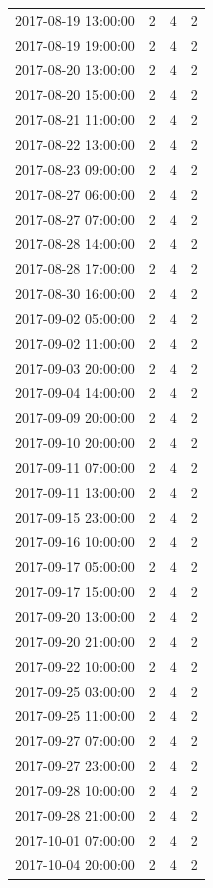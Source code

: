 \begin{tabular}{lrrr}
2017-08-19 13:00:00 & 2 & 4 & 2 \\
2017-08-19 19:00:00 & 2 & 4 & 2 \\
2017-08-20 13:00:00 & 2 & 4 & 2 \\
2017-08-20 15:00:00 & 2 & 4 & 2 \\
2017-08-21 11:00:00 & 2 & 4 & 2 \\
2017-08-22 13:00:00 & 2 & 4 & 2 \\
2017-08-23 09:00:00 & 2 & 4 & 2 \\
2017-08-27 06:00:00 & 2 & 4 & 2 \\
2017-08-27 07:00:00 & 2 & 4 & 2 \\
2017-08-28 14:00:00 & 2 & 4 & 2 \\
2017-08-28 17:00:00 & 2 & 4 & 2 \\
2017-08-30 16:00:00 & 2 & 4 & 2 \\
2017-09-02 05:00:00 & 2 & 4 & 2 \\
2017-09-02 11:00:00 & 2 & 4 & 2 \\
2017-09-03 20:00:00 & 2 & 4 & 2 \\
2017-09-04 14:00:00 & 2 & 4 & 2 \\
2017-09-09 20:00:00 & 2 & 4 & 2 \\
2017-09-10 20:00:00 & 2 & 4 & 2 \\
2017-09-11 07:00:00 & 2 & 4 & 2 \\
2017-09-11 13:00:00 & 2 & 4 & 2 \\
2017-09-15 23:00:00 & 2 & 4 & 2 \\
2017-09-16 10:00:00 & 2 & 4 & 2 \\
2017-09-17 05:00:00 & 2 & 4 & 2 \\
2017-09-17 15:00:00 & 2 & 4 & 2 \\
2017-09-20 13:00:00 & 2 & 4 & 2 \\
2017-09-20 21:00:00 & 2 & 4 & 2 \\
2017-09-22 10:00:00 & 2 & 4 & 2 \\
2017-09-25 03:00:00 & 2 & 4 & 2 \\
2017-09-25 11:00:00 & 2 & 4 & 2 \\
2017-09-27 07:00:00 & 2 & 4 & 2 \\
2017-09-27 23:00:00 & 2 & 4 & 2 \\
2017-09-28 10:00:00 & 2 & 4 & 2 \\
2017-09-28 21:00:00 & 2 & 4 & 2 \\
2017-10-01 07:00:00 & 2 & 4 & 2 \\
2017-10-04 20:00:00 & 2 & 4 & 2 \\

\end{tabular}
